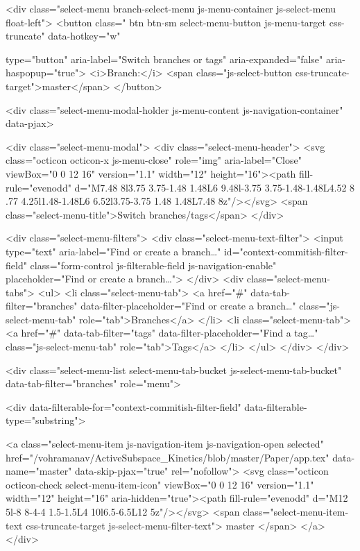 <div class="select-menu branch-select-menu js-menu-container js-select-menu float-left">
  <button class=" btn btn-sm select-menu-button js-menu-target css-truncate" data-hotkey="w"
    
    type="button" aria-label="Switch branches or tags" aria-expanded="false" aria-haspopup="true">
      <i>Branch:</i>
      <span class="js-select-button css-truncate-target">master</span>
  </button>

  <div class="select-menu-modal-holder js-menu-content js-navigation-container" data-pjax>

    <div class="select-menu-modal">
      <div class="select-menu-header">
        <svg class="octicon octicon-x js-menu-close" role="img" aria-label="Close" viewBox="0 0 12 16" version="1.1" width="12" height="16"><path fill-rule="evenodd" d="M7.48 8l3.75 3.75-1.48 1.48L6 9.48l-3.75 3.75-1.48-1.48L4.52 8 .77 4.25l1.48-1.48L6 6.52l3.75-3.75 1.48 1.48L7.48 8z"/></svg>
        <span class="select-menu-title">Switch branches/tags</span>
      </div>

      <div class="select-menu-filters">
        <div class="select-menu-text-filter">
          <input type="text" aria-label="Find or create a branch…" id="context-commitish-filter-field" class="form-control js-filterable-field js-navigation-enable" placeholder="Find or create a branch…">
        </div>
        <div class="select-menu-tabs">
          <ul>
            <li class="select-menu-tab">
              <a href="#" data-tab-filter="branches" data-filter-placeholder="Find or create a branch…" class="js-select-menu-tab" role="tab">Branches</a>
            </li>
            <li class="select-menu-tab">
              <a href="#" data-tab-filter="tags" data-filter-placeholder="Find a tag…" class="js-select-menu-tab" role="tab">Tags</a>
            </li>
          </ul>
        </div>
      </div>

      <div class="select-menu-list select-menu-tab-bucket js-select-menu-tab-bucket" data-tab-filter="branches" role="menu">

        <div data-filterable-for="context-commitish-filter-field" data-filterable-type="substring">


            <a class="select-menu-item js-navigation-item js-navigation-open selected"
               href="/vohramanav/ActiveSubspace_Kinetics/blob/master/Paper/app.tex"
               data-name="master"
               data-skip-pjax="true"
               rel="nofollow">
              <svg class="octicon octicon-check select-menu-item-icon" viewBox="0 0 12 16" version="1.1" width="12" height="16" aria-hidden="true"><path fill-rule="evenodd" d="M12 5l-8 8-4-4 1.5-1.5L4 10l6.5-6.5L12 5z"/></svg>
              <span class="select-menu-item-text css-truncate-target js-select-menu-filter-text">
                master
              </span>
            </a>
        </div>

